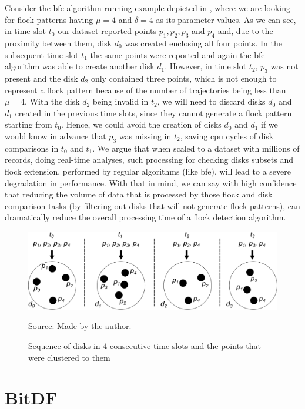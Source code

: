 Consider the \ac{bfe} algorithm running example depicted in , where we are looking for flock patterns
having $\mu=4$ and $\delta=4$ as its parameter values. As we can see, in time slot $t_0$ our dataset reported points
$p_1,p_2,p_3$ and $p_4$ and, due to the proximity between them, disk $d_0$ was created enclosing all four points. In
the subsequent time slot $t_1$ the same points were reported and again the \ac{bfe} algorithm was able to create another
disk $d_1$. However, in time slot $t_2$, $p_3$ was not present and the disk $d_2$ only contained three points, which is
not enough to represent a flock pattern because of the number of trajectories being less than $\mu = 4$. With the disk
$d_2$ being invalid in $t_2$, we will need to discard disks $d_0$ and $d_1$ created in the previous time slots, since
they cannot generate a flock pattern starting from $t_0$. Hence, we could avoid the creation of disks $d_0$ and $d_1$ if
we would know in advance that $p_3$ was missing in $t_2$, saving \ac{cpu} cycles of disk comparisons in $t_0$ and $t_1$.
We argue that when scaled to a dataset with millions of records, doing real-time analyses, such processing for checking
disks subsets and flock extension, performed by regular algorithms (like \ac{bfe}), will lead to a severe degradation in
performance. With that in mind, we can say with high confidence that reducing the volume of data that is processed by
those flock and disk comparison tasks (by filtering out disks that will not generate flock patterns), can dramatically
reduce the overall processing time of a flock detection algorithm.

\begin{figure}[h!]
    \centering
    \caption{Sequence of disks in 4 consecutive time slots and the points that were clustered to them}
    \centerline{\includegraphics[width=\linewidth]{images/disks.eps}}
    \footnotesize{Source: Made by the author.}
    \label{fig:disks}
\end{figure}

\section{BitDF}
\label{sec:bitdf}

